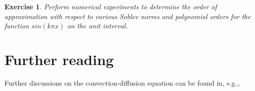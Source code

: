 \documentclass[a4paper,11pt]{amsart}
\newtheorem{exercise}{Exercise}[section]
\begin{document}
\begin{exercise}
Perform numerical experiments to determine the order of approximation with respect 
to various Soblev norms and polynomial orders for the function  
$sin(k \pi x)$ on 
the unit interval.
\end{exercise}






\section{Further reading}
Further discussions on the convection-diffusion equation can be 
found in, e.g.,\cite{elman2005finite, johnson2009numerical, quarteroni2008numerical}.  




\end{document}

